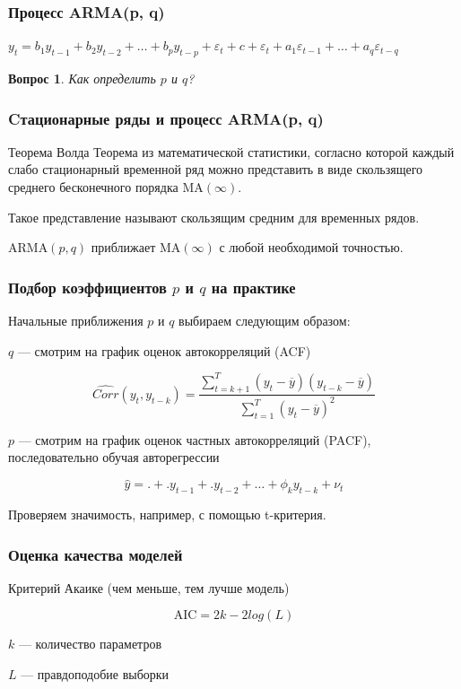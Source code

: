 \documentclass[fullscreen=true, bookmarks=true, hyperref={pdfencoding=unicode}]{beamer}
\newtheorem*{question}{Вопрос}
\begin{document}
\begin{frame}
  \frametitle{Процесс ARMA(p, q)}

  $ y_t = b_1y_{t-1} + b_2y_{t-2} + \dots + b_py_{t-p} + \varepsilon_t + c + \varepsilon_t + a_1\varepsilon_{t-1} + \dots + a_q\varepsilon_{t-q} $
  \pause
  \vspace{1cm}
  \begin{question}
    Как определить $p$ и $q$?
  \end{question}
\end{frame}


\begin{frame}
  \frametitle{Cтационарные ряды и процесс ARMA(p, q)}

  \begin{block}{Теорема Волда}
   Теорема из математической статистики, согласно которой каждый слабо стационарный временной ряд можно представить в виде скользящего среднего бесконечного порядка $\mathrm{MA}(\infty)$.
  \end{block}

  Такое представление называют скользящим средним для временных рядов.

  \vspace{1cm}
  $\mathrm{ARMA}(p, q)$ приближает $\mathrm{MA}(\infty)$ с любой необходимой точностью.
\end{frame}


\begin{frame}
  \frametitle{Подбор коэффициентов $p$ и $q$ на практике}

  Начальные приближения $p$ и $q$ выбираем следующим образом:

  $q$ — смотрим на график оценок автокорреляций (ACF)

  $$ \hat{Corr}(y_t, y_{t-k}) = \frac{\sum\limits_{t=k+1}^T (y_t - \overline{y})(y_{t-k} - \overline{y}) }{\sum\limits_{t=1}^T (y_t - \overline{y})^2} $$

  \vspace{1cm}
  $p$ — смотрим на график оценок частных автокорреляций (PACF), последовательно обучая авторегрессии

  $$ \hat y = . + .y_{t-1} + .y_{t-2} + \dots + \phi_k y_{t-k} + \nu_t $$

  Проверяем значимость, например, с помощью t-критерия.
\end{frame}


\begin{frame}
  \frametitle{Оценка качества моделей}

  \begin{block}{Критерий Акаике}
    (чем меньше, тем лучше модель)

    $$ \text{AIC} = 2k - 2log(L)$$

    $k$ — количество параметров

    $L$ — правдоподобие выборки
  \end{block}
\end{frame}
\end{document}
